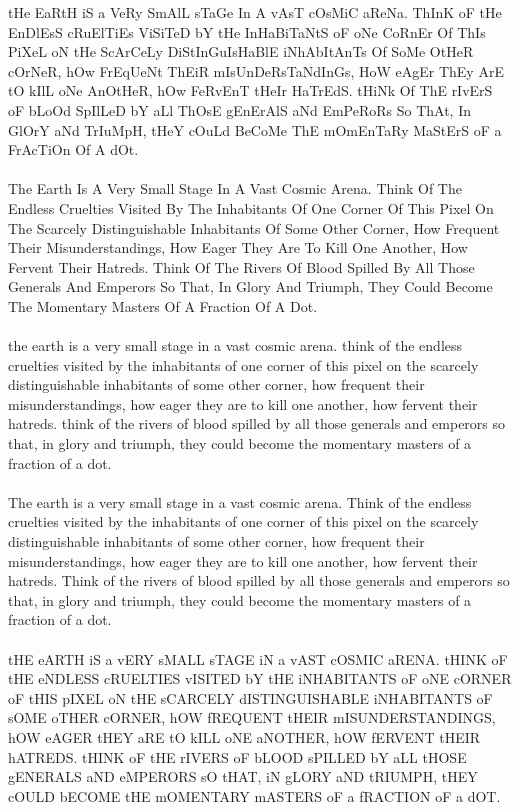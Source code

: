 {\begin{testcases}
	{tHe EaRtH iS a VeRy SmAlL sTaGe In A vAsT cOsMiC aReNa. ThInK oF tHe EnDlEsS cRuElTiEs ViSiTeD bY tHe InHaBiTaNtS oF oNe CoRnEr Of ThIs PiXeL oN tHe ScArCeLy DiStInGuIsHaBlE iNhAbItAnTs Of SoMe OtHeR cOrNeR, hOw FrEqUeNt ThEiR mIsUnDeRsTaNdInGs, HoW eAgEr ThEy ArE tO kIlL oNe AnOtHeR, hOw FeRvEnT tHeIr HaTrEdS. tHiNk Of ThE rIvErS oF bLoOd SpIlLeD bY aLl ThOsE gEnErAlS aNd EmPeRoRs So ThAt, In GlOrY aNd TrIuMpH, tHeY cOuLd BeCoMe ThE mOmEnTaRy MaStErS oF a FrAcTiOn Of A dOt.\\\\
The Earth Is A Very Small Stage In A Vast Cosmic Arena. Think Of The Endless Cruelties Visited By The Inhabitants Of One Corner Of This Pixel On The Scarcely Distinguishable Inhabitants Of Some Other Corner, How Frequent Their Misunderstandings, How Eager They Are To Kill One Another, How Fervent Their Hatreds. Think Of The Rivers Of Blood Spilled By All Those Generals And Emperors So That, In Glory And Triumph, They Could Become The Momentary Masters Of A Fraction Of A Dot.\\\\
the earth is a very small stage in a vast cosmic arena. think of the endless cruelties visited by the inhabitants of one corner of this pixel on the scarcely distinguishable inhabitants of some other corner, how frequent their misunderstandings, how eager they are to kill one another, how fervent their hatreds. think of the rivers of blood spilled by all those generals and emperors so that, in glory and triumph, they could become the momentary masters of a fraction of a dot.\\\\
The earth is a very small stage in a vast cosmic arena. Think of the endless cruelties visited by the inhabitants of one corner of this pixel on the scarcely distinguishable inhabitants of some other corner, how frequent their misunderstandings, how eager they are to kill one another, how fervent their hatreds. Think of the rivers of blood spilled by all those generals and emperors so that, in glory and triumph, they could become the momentary masters of a fraction of a dot.\\\\
tHE eARTH iS a vERY sMALL sTAGE iN a vAST cOSMIC aRENA. tHINK oF tHE eNDLESS cRUELTIES vISITED bY tHE iNHABITANTS oF oNE cORNER oF tHIS pIXEL oN tHE sCARCELY dISTINGUISHABLE iNHABITANTS oF sOME oTHER cORNER, hOW fREQUENT tHEIR mISUNDERSTANDINGS, hOW eAGER tHEY aRE tO kILL oNE aNOTHER, hOW fERVENT tHEIR hATREDS. tHINK oF tHE rIVERS oF bLOOD sPILLED bY aLL tHOSE gENERALS aND eMPERORS sO tHAT, iN gLORY aND tRIUMPH, tHEY cOULD bECOME tHE mOMENTARY mASTERS oF a fRACTION oF a dOT.\\\\
}
\end{testcases}}
